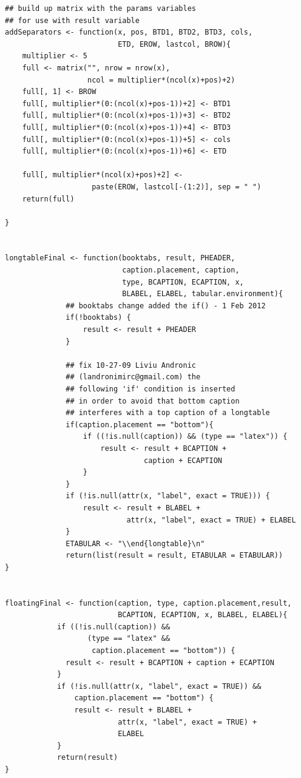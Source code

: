 \documentclass{memoir}\usepackage[]{graphicx}\usepackage[]{color}
\begin{document}
\begin{lstlisting}
## build up matrix with the params variables 
## for use with result variable
addSeparators <- function(x, pos, BTD1, BTD2, BTD3, cols, 
                          ETD, EROW, lastcol, BROW){
    multiplier <- 5
    full <- matrix("", nrow = nrow(x), 
                   ncol = multiplier*(ncol(x)+pos)+2)
    full[, 1] <- BROW
    full[, multiplier*(0:(ncol(x)+pos-1))+2] <- BTD1
    full[, multiplier*(0:(ncol(x)+pos-1))+3] <- BTD2
    full[, multiplier*(0:(ncol(x)+pos-1))+4] <- BTD3
    full[, multiplier*(0:(ncol(x)+pos-1))+5] <- cols
    full[, multiplier*(0:(ncol(x)+pos-1))+6] <- ETD

    full[, multiplier*(ncol(x)+pos)+2] <- 
                    paste(EROW, lastcol[-(1:2)], sep = " ")
    return(full)

}


longtableFinal <- function(booktabs, result, PHEADER, 
                           caption.placement, caption,
                           type, BCAPTION, ECAPTION, x, 
                           BLABEL, ELABEL, tabular.environment){
              ## booktabs change added the if() - 1 Feb 2012
              if(!booktabs) {
                  result <- result + PHEADER
              }

              ## fix 10-27-09 Liviu Andronic 
              ## (landronimirc@gmail.com) the
              ## following 'if' condition is inserted 
              ## in order to avoid that bottom caption 
              ## interferes with a top caption of a longtable
              if(caption.placement == "bottom"){
                  if ((!is.null(caption)) && (type == "latex")) {
                      result <- result + BCAPTION + 
                                caption + ECAPTION
                  }
              }
              if (!is.null(attr(x, "label", exact = TRUE))) {
                  result <- result + BLABEL + 
                            attr(x, "label", exact = TRUE) + ELABEL
              }
              ETABULAR <- "\\end{longtable}\n"
              return(list(result = result, ETABULAR = ETABULAR))   
}


floatingFinal <- function(caption, type, caption.placement,result,
                          BCAPTION, ECAPTION, x, BLABEL, ELABEL){
            if ((!is.null(caption)) &&
                   (type == "latex" && 
                    caption.placement == "bottom")) {
              result <- result + BCAPTION + caption + ECAPTION
            }
            if (!is.null(attr(x, "label", exact = TRUE)) &&
                caption.placement == "bottom") {
                result <- result + BLABEL + 
                          attr(x, "label", exact = TRUE) +
                          ELABEL
            }
            return(result)
}
\end{lstlisting}
\end{document}
